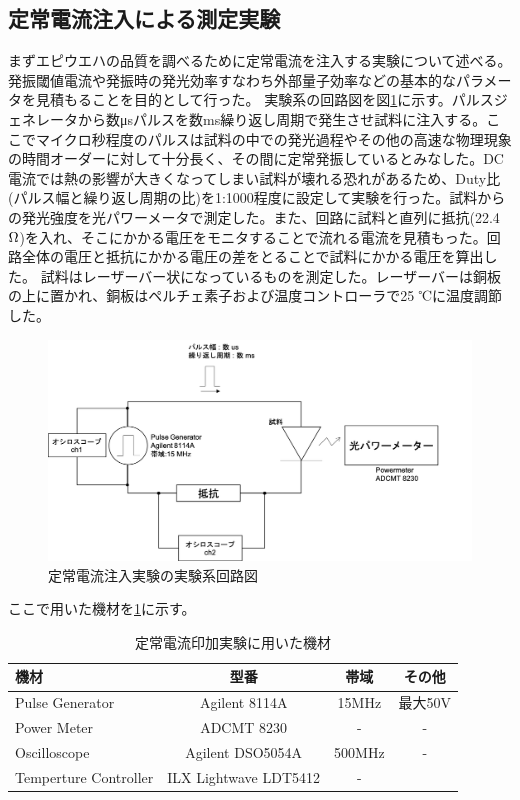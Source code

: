 \subsection{定常電流注入による測定実験}%
まずエピウエハの品質を調べるために定常電流を注入する実験について述べる。発振閾値電流や発振時の発光効率すなわち外部量子効率などの基本的なパラメータを見積もることを目的として行った。
実験系の回路図を図\ref{fig:fig_2_2_IL_setup}に示す。パルスジェネレータから数\si{\micro s}パルスを数ms繰り返し周期で発生させ試料に注入する。ここでマイクロ秒程度のパルスは試料の中での発光過程やその他の高速な物理現象の時間オーダーに対して十分長く、その間に定常発振しているとみなした。DC電流では熱の影響が大きくなってしまい試料が壊れる恐れがあるため、Duty比(パルス幅と繰り返し周期の比)を1:1000程度に設定して実験を行った。試料からの発光強度を光パワーメータで測定した。また、回路に試料と直列に抵抗(22.4 $\rm{\Omega}$)を入れ、そこにかかる電圧をモニタすることで流れる電流を見積もった。回路全体の電圧と抵抗にかかる電圧の差をとることで試料にかかる電圧を算出した。
試料はレーザーバー状になっているものを測定した。レーザーバーは銅板の上に置かれ、銅板はペルチェ素子および温度コントローラで25 ℃に温度調節した。

\begin{figure}[htbp]
	\includegraphics[width=15cm]{figure/fig_2_2_IL_setup.png}
	\caption{定常電流注入実験の実験系回路図}
	\label{fig:fig_2_2_IL_setup}
\end{figure}
\clearpage
ここで用いた機材を\ref{table:table_2_2_IL_setup}に示す。
\begin{table}[h]
  \caption{定常電流印加実験に用いた機材}
    \label{table:table_2_2_IL_setup}
  \centering
  \begin{tabular}{lccc}
    \hline
    機材  & 型番 &帯域  & その他  \\
    \hline \hline
    Pulse Generator  & Agilent 8114A & 15MHz &最大50V \\
    Power Meter  &  ADCMT 8230 & -&-  \\
    Oscilloscope  &  Agilent DSO5054A &500MHz&- \\
    Temperture Controller & ILX Lightwave  LDT5412&-\\
       \hline
  \end{tabular}
\end{table}

